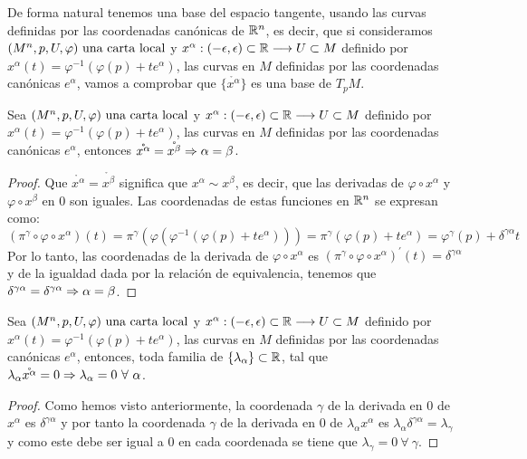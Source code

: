 De forma natural tenemos una base del espacio tangente, usando las curvas definidas por las
coordenadas canónicas de $\mathbb{R}^n$, es decir, que si consideramos $(M^n,p,U,\varphi)\textmd{ una carta local}$ y $x^\alpha:(-\epsilon, \epsilon)\subset\mathbb{R}\longrightarrow U\subset M$ definido por $x^\alpha(t)=\varphi^{-1}(\varphi(p)+te^\alpha)$, las curvas en $M$
definidas por las coordenadas canónicas $e^\alpha$,
vamos a comprobar que $\{\mathring{x^\alpha}\}$ es una base de $T_pM$.

\begin{proposition}
  Sea $(M^n,p,U,\varphi)\textmd{ una carta local}$ y $
  x^\alpha:(-\epsilon, \epsilon)
  \subset\mathbb{R}\longrightarrow U\subset M$ definido por $x^\alpha(t)=\varphi^{-1}(\varphi(p)+te^\alpha)$, las
  curvas en
  $M$
  definidas por las coordenadas canónicas $e^\alpha$, entonces
  $\mathring{x^\alpha}=\mathring{x^\beta}\Rightarrow\alpha=\beta$.
\end{proposition}
\begin{proof}
  Que $\mathring{x^\alpha}=\mathring{x^\beta}$ significa que
  $x^\alpha\sim x^\beta$, es decir, que las derivadas de
  $\varphi\circ x^\alpha$ y $\varphi\circ x^\beta$ en 0 son iguales.
  Las coordenadas de estas funciones en $\mathbb{R}^n$ se expresan como:
  \begin{equation*}
    (\pi^\gamma\circ\varphi\circ x^\alpha)(t)=\pi^\gamma(\varphi(\varphi^{-1}(\varphi(p)
    +te^\alpha)))=\pi^\gamma(\varphi(p)
    +te^\alpha)=\varphi^\gamma(p)+\delta^{\gamma\alpha} t
  \end{equation*}
  Por lo tanto, las coordenadas de la derivada de $\varphi\circ x^\alpha$ es
  $(\pi^\gamma\circ\varphi\circ x^\alpha)^\prime(t)=\delta^{\gamma\alpha}$ y de la igualdad dada
  por la relación de equivalencia, tenemos que
  $\delta^{\gamma\alpha}=\delta^{\gamma\alpha}\Rightarrow\alpha=\beta$.
\end{proof}

\begin{proposition}
  Sea $(M^n,p,U,\varphi)\textmd{ una carta local}$ y $
  x^\alpha:(-\epsilon, \epsilon)
  \subset\mathbb{R}\longrightarrow U\subset M$ definido por $x^\alpha(t)=\varphi^{-1}(\varphi(p)+te^\alpha)$, las curvas en
  $M$
  definidas por las coordenadas canónicas $e^\alpha$, entonces, toda familia de
  $\{\lambda_\alpha\}\subset\mathbb{R}$, tal que
  $\lambda_\alpha\mathring{x^\alpha}=0\so\lambda_\alpha=0\ \forall\ \alpha$.
\end{proposition}
\begin{proof}
  Como hemos visto anteriormente, la coordenada $\gamma$ de la derivada en $0$ de $x^\alpha$ es
  $\delta^{\gamma\alpha}$ y por tanto la coordenada $\gamma$ de la derivada en $0$ de
  $\lambda_\alpha x^\alpha$ es $\lambda_\alpha\delta^{\gamma\alpha}=\lambda_\gamma$ y como este
  debe ser igual a $0$ en cada coordenada se tiene que $\lambda_\gamma=0\ \forall\ \gamma$.
\end{proof}

